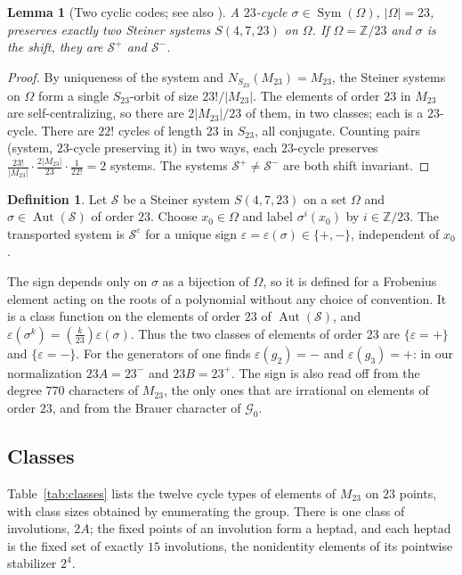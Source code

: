 \documentclass[11pt]{amsart}
\newtheorem{lemma}[theorem]{Lemma}
\theoremstyle{definition}
\newtheorem{definition}[theorem]{Definition}
\newcommand{\ZZ}{\mathbb{Z}}
\newcommand{\Aut}{\operatorname{Aut}}
\newcommand{\Sym}{\operatorname{Sym}}
\newcommand{\M}{M_{23}}
\newcommand{\cG}{\mathcal{G}}
\newcommand{\cS}{\mathcal{S}}
\begin{document}
\begin{lemma}[Two cyclic codes; see also {\cite[\S5.4]{LeLay26}}]\label{lem:twocodes}
A $23$-cycle $\sigma\in\Sym(\Omega)$, $|\Omega|=23$, preserves exactly two Steiner systems $S(4,7,23)$ on $\Omega$. If $\Omega=\ZZ/23$ and $\sigma$ is the shift, they are $\cS^+$ and $\cS^-$.
\end{lemma}
\begin{proof}
By uniqueness of the system and $N_{S_{23}}(\M)=\M$, the Steiner systems on $\Omega$ form a single $S_{23}$-orbit of size $23!/|\M|$. The elements of order $23$ in $\M$ are self-centralizing, so there are $2|\M|/23$ of them, in two classes; each is a $23$-cycle. There are $22!$ cycles of length $23$ in $S_{23}$, all conjugate. Counting pairs (system, $23$-cycle preserving it) in two ways, each $23$-cycle preserves $\frac{23!}{|\M|}\cdot\frac{2|\M|}{23}\cdot\frac1{22!}=2$ systems. The systems $\cS^+\ne\cS^-$ are both shift invariant.
\end{proof}

\begin{definition}\label{def:sign}
Let $\cS$ be a Steiner system $S(4,7,23)$ on a set $\Omega$ and $\sigma\in\Aut(\cS)$ of order $23$. Choose $x_0\in\Omega$ and label $\sigma^i(x_0)$ by $i\in\ZZ/23$. The transported system is $\cS^{\varepsilon}$ for a unique sign $\varepsilon=\varepsilon(\sigma)\in\{+,-\}$, independent of $x_0$.
\end{definition}

The sign depends only on $\sigma$ as a bijection of $\Omega$, so it is defined for a Frobenius element acting on the roots of a polynomial without any choice of convention. It is a class function on the elements of order $23$ of $\Aut(\cS)$, and $\varepsilon(\sigma^k)=\left(\frac{k}{23}\right)\varepsilon(\sigma)$. Thus the two classes of elements of order $23$ are $\{\varepsilon=+\}$ and $\{\varepsilon=-\}$. For the generators of \cite{HJLPPZ26} one finds $\varepsilon(g_2)=-$ and $\varepsilon(g_3)=+$: in our normalization $23A=23^-$ and $23B=23^+$. The sign is also read off from the degree $770$ characters of $\M$, the only ones that are irrational on elements of order $23$, and from the Brauer character of $\cG_0$.

\subsection{Classes}
Table~\ref{tab:classes} lists the twelve cycle types of elements of $\M$ on $23$ points, with class sizes obtained by enumerating the group. There is one class of involutions, $2A$; the fixed points of an involution form a heptad, and each heptad is the fixed set of exactly $15$ involutions, the nonidentity elements of its pointwise stabilizer $2^4$.
\end{document}
